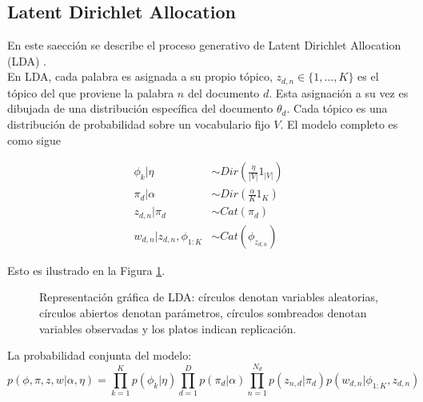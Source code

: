 \documentclass[letterpaper,12pt,oneside]{book} %
\begin{document}
\subsection{Latent Dirichlet Allocation}
\label{sec:lda}
En este saección se describe el proceso generativo de Latent Dirichlet Allocation (LDA) \citep{blei2003latent}. \\

En LDA, cada palabra es asignada a su propio tópico, $z_{d,n}\in\{1, \ldots, K\}$ es el tópico del que proviene la palabra $n$ del documento $d$. Esta asignación a su vez es dibujada de una distribución específica del documento $\theta_{d}$. Cada tópico es una distribución de probabilidad sobre un vocabulario fijo $V$. El modelo completo es como sigue

\begin{align}
    \phi_{k}|\eta & \sim Dir(\frac{\eta}{|V|}1_{|V|})\\
    \pi_{d}|\alpha & \sim Dir(\frac{\alpha}{K}1_{K})\\
    z_{d,n}|\pi_{d} & \sim Cat(\pi_{d})\\
    w_{d,n}|z_{d,n}, \phi_{1:K} & \sim Cat(\phi_{z_{d,n}})
\end{align}

Esto es ilustrado en la Figura \ref{img:lda}.
\begin{figure}
  \centering
\caption{Representación gráfica de LDA: círculos denotan variables aleatorias, círculos abiertos denotan parámetros, círculos sombreados denotan variables observadas y los platos indican replicación.}
\label{img:lda}
\end{figure}

La probabilidad conjunta del modelo:
\begin{equation}
    p(\phi, \pi, z, w|\alpha, \eta)= \prod_{k=1}^{K}p(\phi_{k}|\eta)\prod_{d=1}^{D}p(\pi_{d}|\alpha)\prod_{n=1}^{N_{d}}p(z_{n,d}|\pi_{d})p(w_{d,n}|\phi_{1:K}, z_{d,n})
\end{equation}
\end{document}
